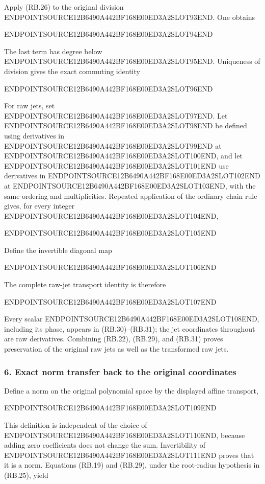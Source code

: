 Apply (RB.26) to the original division ENDPOINTSOURCE12B6490A442BF168E00ED3A2SLOT93END. One obtains

ENDPOINTSOURCE12B6490A442BF168E00ED3A2SLOT94END

The last term has degree below ENDPOINTSOURCE12B6490A442BF168E00ED3A2SLOT95END. Uniqueness of division gives the exact commuting identity

ENDPOINTSOURCE12B6490A442BF168E00ED3A2SLOT96END

For raw jets, set ENDPOINTSOURCE12B6490A442BF168E00ED3A2SLOT97END. Let ENDPOINTSOURCE12B6490A442BF168E00ED3A2SLOT98END be defined using derivatives in ENDPOINTSOURCE12B6490A442BF168E00ED3A2SLOT99END at ENDPOINTSOURCE12B6490A442BF168E00ED3A2SLOT100END, and let ENDPOINTSOURCE12B6490A442BF168E00ED3A2SLOT101END use derivatives in ENDPOINTSOURCE12B6490A442BF168E00ED3A2SLOT102END at ENDPOINTSOURCE12B6490A442BF168E00ED3A2SLOT103END, with the same ordering and multiplicities. Repeated application of the ordinary chain rule gives, for every integer ENDPOINTSOURCE12B6490A442BF168E00ED3A2SLOT104END,

ENDPOINTSOURCE12B6490A442BF168E00ED3A2SLOT105END

Define the invertible diagonal map

ENDPOINTSOURCE12B6490A442BF168E00ED3A2SLOT106END

The complete raw-jet transport identity is therefore

ENDPOINTSOURCE12B6490A442BF168E00ED3A2SLOT107END

Every scalar ENDPOINTSOURCE12B6490A442BF168E00ED3A2SLOT108END, including its phase, appears in (RB.30)--(RB.31); the jet coordinates throughout are raw derivatives. Combining (RB.22), (RB.29), and (RB.31) proves preservation of the original raw jets as well as the transformed raw jets.

\subsubsection{6. Exact norm transfer back to the original coordinates}\label{endpoint-relation_balance_original--exact-norm-transfer-back-to-the-original-coordinates}

Define a norm on the original polynomial space by the displayed affine transport,

ENDPOINTSOURCE12B6490A442BF168E00ED3A2SLOT109END

This definition is independent of the choice of ENDPOINTSOURCE12B6490A442BF168E00ED3A2SLOT110END, because adding zero coefficients does not change the sum. Invertibility of ENDPOINTSOURCE12B6490A442BF168E00ED3A2SLOT111END proves that it is a norm. Equations (RB.19) and (RB.29), under the root-radius hypothesis in (RB.25), yield

